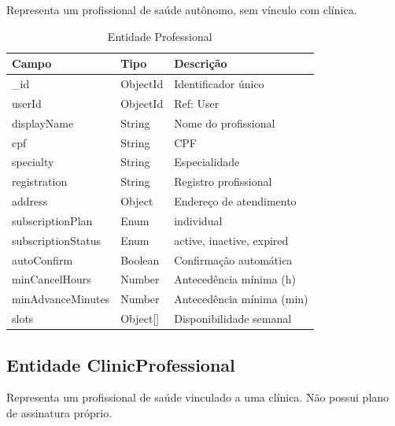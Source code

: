 Representa um profissional de saúde autônomo,
sem vínculo com clínica.

\begin{table}[H]
  \centering
  \caption{Entidade Professional}
  \label{tab:entity-professional}
  \begin{tabular}{p{3cm}p{3cm}p{5.5cm}}
    \toprule
    \textbf{Campo} &
    \textbf{Tipo} &
    \textbf{Descrição} \\
    \midrule
    \_id               & ObjectId  & Identificador único \\
    userId             & ObjectId  & Ref: User \\
    displayName        & String    & Nome do profissional \\
    cpf                & String    & CPF \\
    specialty          & String    & Especialidade \\
    registration       & String    & Registro profissional \\
    address            & Object    & Endereço de atendimento \\
    subscriptionPlan   & Enum      & individual \\
    subscriptionStatus & Enum      & active, inactive, expired \\
    autoConfirm        & Boolean   & Confirmação automática \\
    minCancelHours     & Number    & Antecedência mínima (h) \\
    minAdvanceMinutes  & Number    & Antecedência mínima (min) \\
    slots              & Object[]  & Disponibilidade semanal \\
    \bottomrule
  \end{tabular}
\end{table}

\subsection{Entidade ClinicProfessional}
\label{subsec:entity-clinic-professional}

Representa um profissional de saúde vinculado a
uma clínica. Não possui plano de assinatura próprio.

